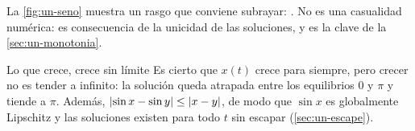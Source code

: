 
La \cref{fig:un-seno} muestra un rasgo que conviene subrayar: . No es una casualidad numérica: es consecuencia de la unicidad de las soluciones, y es la clave de la \cref{sec:un-monotonia}.

\begin{trampa}[label=tr:un-infinito]{Lo que crece, crece sin límite}
Es cierto que $x(t)$ crece para siempre, pero crecer no es tender a infinito: la solución queda atrapada entre los equilibrios $0$ y $\pi$ y tiende a $\pi$. Además, $\left\lvert \sin x-\sin y\right\rvert\le\left\lvert x-y\right\rvert$, de modo que $\sin x$ es globalmente Lipschitz y las soluciones existen para todo $t$ sin escapar (\cref{sec:un-escape}).
\end{trampa}
